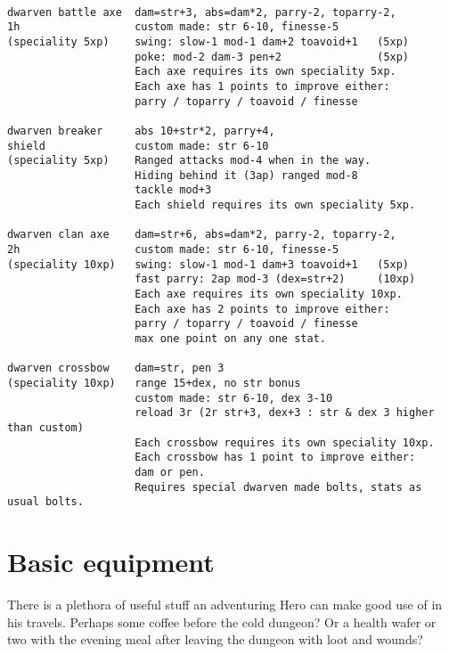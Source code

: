 \

\small \begin{verbatim}
dwarven battle axe  dam=str+3, abs=dam*2, parry-2, toparry-2,
1h                  custom made: str 6-10, finesse-5
(speciality 5xp)    swing: slow-1 mod-1 dam+2 toavoid+1   (5xp)
                    poke: mod-2 dam-3 pen+2               (5xp)
                    Each axe requires its own speciality 5xp.
                    Each axe has 1 points to improve either: 
                    parry / toparry / toavoid / finesse

dwarven breaker     abs 10+str*2, parry+4,
shield              custom made: str 6-10
(speciality 5xp)    Ranged attacks mod-4 when in the way.
                    Hiding behind it (3ap) ranged mod-8
                    tackle mod+3
                    Each shield requires its own speciality 5xp.

dwarven clan axe    dam=str+6, abs=dam*2, parry-2, toparry-2,
2h                  custom made: str 6-10, finesse-5
(speciality 10xp)   swing: slow-1 mod-1 dam+3 toavoid+1   (5xp)
                    fast parry: 2ap mod-3 (dex=str+2)     (10xp)
                    Each axe requires its own speciality 10xp.
                    Each axe has 2 points to improve either: 
                    parry / toparry / toavoid / finesse
                    max one point on any one stat.

dwarven crossbow    dam=str, pen 3
(speciality 10xp)   range 15+dex, no str bonus
                    custom made: str 6-10, dex 3-10
                    reload 3r (2r str+3, dex+3 : str & dex 3 higher than custom)
                    Each crossbow requires its own speciality 10xp.
                    Each crossbow has 1 point to improve either:
                    dam or pen.
                    Requires special dwarven made bolts, stats as usual bolts.
\end{verbatim} \normalsize








\section*{Basic equipment}

There is a plethora of useful stuff an adventuring Hero can make good use of in his travels. Perhaps some coffee before the cold dungeon? Or a health wafer or two with the evening meal after leaving the dungeon with loot and wounds?

